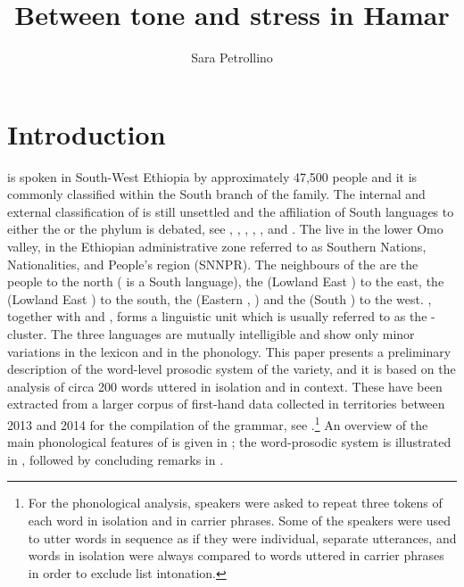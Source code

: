 \documentclass[output=paper]{LSP/langsci}
\author{Sara Petrollino
\affiliation{Laboratoire Dynamique Du Langage, Lyon and Leiden University}
}
\title{Between tone and stress in Hamar}
\begin{document}
\section{Introduction} \label{sec:Petrollino:1}

 is spoken in South-West Ethiopia by approximately 47,500 people \citep{SimonsFenning2017} and it is commonly classified within the South  branch of the  family. The internal and external classification of  is still unsettled and the affiliation of South  languages to either the  or the  phylum is debated, see \citet{Zaborski2004}, \citet{Blažek2008}, \citet{Bender2000, Bender2003}, \citet{Hayward2003}, \citet{Fleming1974}, and \citet{Azeb2012}. The  live in the lower Omo valley, in the Ethiopian administrative zone referred to as Southern Nations, Nationalities, and People's region (SNNPR). The neighbours of the  are the  people to the north ( is a South  language), the  (Lowland East ) to the east, the  (Lowland East ) to the south, the  (Eastern , ) and the  (South ) to the west. , together with  and , forms a linguistic unit which is usually referred to as the - cluster. The three languages are mutually intelligible and show only minor variations in the lexicon and in the phonology. This paper presents a preliminary description of the word-level prosodic system of the  variety, and it is based on the analysis of circa 200  words uttered in isolation and in context. These have been extracted from a larger corpus of first-hand data collected in  territories between 2013 and 2014 for the compilation of the  grammar, see \citet{Petrollino2016}.\footnote{For the phonological analysis, speakers were asked to repeat three tokens of each word in isolation and in carrier phrases. Some of the speakers were used to utter words in sequence as if they were individual, separate utterances, and words in isolation were always compared to words uttered in carrier phrases in order to exclude list intonation.} An overview of the main phonological features of  is given in ; the word-prosodic system is illustrated in , followed by concluding remarks in .  
\end{document}
